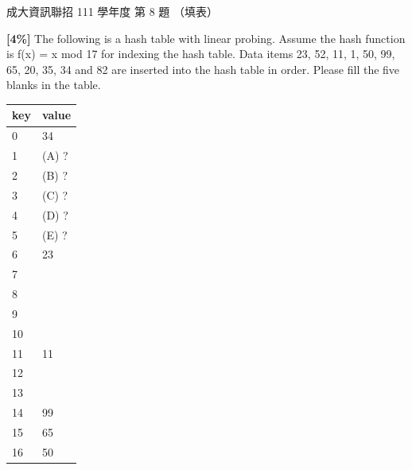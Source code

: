 \begin{pastexam}[label={px:ncku-111-prog-08}]{成大資訊聯招 111 學年度 第 8 題}
（填表）

\textbf{[4\%]} The following is a hash table with linear probing. Assume the hash function is f(x) = x mod 17 for indexing the hash table. Data items 23, 52, 11, 1, 50, 99, 65, 20, 35, 34 and 82 are inserted into the hash table in order. Please fill the five blanks in the table.
\begin{center}
\begin{tabular}{|l|l|}
\hline
key & value \\ \hline
0 & 34 \\ \hline
1 & (A) ? \\ \hline
2 & (B) ? \\ \hline
3 & (C) ? \\ \hline
4 & (D) ? \\ \hline
5 & (E) ? \\ \hline
6 & 23 \\ \hline
7 & \\ \hline
8 & \\ \hline
9 & \\ \hline
10 & \\ \hline
11 & 11 \\ \hline
12 & \\ \hline
13 & \\ \hline
14 & 99 \\ \hline
15 & 65 \\ \hline
16 & 50 \\ \hline
\end{tabular}
\end{center}
\end{pastexam}

